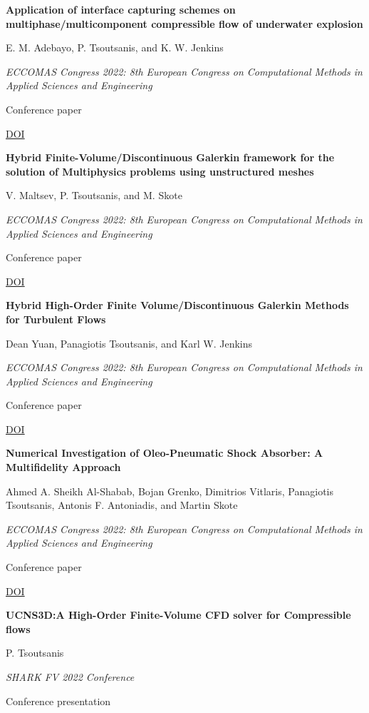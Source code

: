\documentclass[11pt,a4paper]{article}
\newlength{\cventrysep}
\newenvironment{cventry}{%
  \par\noindent\begin{minipage}{\linewidth}
  \RaggedRight\fontsize{9.8}{12.5}\selectfont
}{\end{minipage}\par\addvspace{\cventrysep}}
\newcommand{\cvtitle}[1]{{\bfseries #1\par}\vspace{1pt}}
\newcommand{\cvdetail}[1]{{#1\par}\vspace{1pt}}
\newcommand{\cvmeta}[1]{{\fontsize{9}{11.5}\selectfont\color{Muted}#1\par}\vspace{1pt}}
\newcommand{\cvlinks}[1]{{\fontsize{9}{11.5}\selectfont #1\par}}
\begin{document}
\begin{cventry}
\cvtitle{Application of interface capturing schemes on multiphase/multicomponent compressible flow of underwater explosion}
\cvdetail{E. M. Adebayo, P. Tsoutsanis, and K. W. Jenkins}
\cvmeta{\textit{ECCOMAS Congress 2022: 8th European Congress on Computational Methods in Applied Sciences and Engineering}\par Conference paper}
\cvlinks{\href{https://doi.org/10.23967/eccomas.2022.052}{DOI}}
\end{cventry}

\begin{cventry}
\cvtitle{Hybrid Finite-Volume/Discontinuous Galerkin framework for the solution of Multiphysics problems using unstructured meshes}
\cvdetail{V. Maltsev, P. Tsoutsanis, and M. Skote}
\cvmeta{\textit{ECCOMAS Congress 2022: 8th European Congress on Computational Methods in Applied Sciences and Engineering}\par Conference paper}
\cvlinks{\href{https://doi.org/10.23967/eccomas.2022.140}{DOI}}
\end{cventry}

\begin{cventry}
\cvtitle{Hybrid High-Order Finite Volume/Discontinuous Galerkin Methods for Turbulent Flows}
\cvdetail{Dean Yuan, Panagiotis Tsoutsanis, and Karl W. Jenkins}
\cvmeta{\textit{ECCOMAS Congress 2022: 8th European Congress on Computational Methods in Applied Sciences and Engineering}\par Conference paper}
\cvlinks{\href{https://doi.org/10.23967/eccomas.2022.141}{DOI}}
\end{cventry}

\begin{cventry}
\cvtitle{Numerical Investigation of Oleo-Pneumatic Shock Absorber: A Multifidelity Approach}
\cvdetail{Ahmed A. Sheikh Al-Shabab, Bojan Grenko, Dimitrios Vitlaris, Panagiotis Tsoutsanis, Antonis F. Antoniadis, and Martin Skote}
\cvmeta{\textit{ECCOMAS Congress 2022: 8th European Congress on Computational Methods in Applied Sciences and Engineering}\par Conference paper}
\cvlinks{\href{https://doi.org/10.23967/eccomas.2022.201}{DOI}}
\end{cventry}

\begin{cventry}
\cvtitle{UCNS3D:A High-Order Finite-Volume CFD solver for Compressible flows}
\cvdetail{P. Tsoutsanis}
\cvmeta{\textit{SHARK FV 2022 Conference}\par Conference presentation}
\end{cventry}
\end{document}
